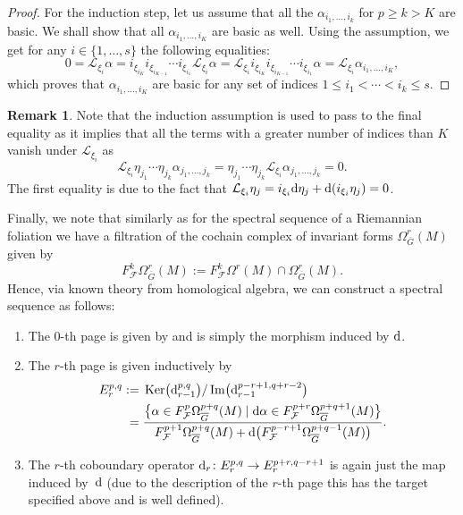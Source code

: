 \documentclass[pdftex]{sigma}
\numberwithin{equation}{section}
\theoremstyle{definition}
\newtheorem{rem}[tw]{Remark}
\begin{document}
\begin{proof}
For the induction step, let us assume that all the $\alpha_{i_1,\dots,i_{k}}$ for $p\geq k>K$ are basic. We shall show that all $\alpha_{i_1,\dots,i_{K}}$ are basic as well. Using the assumption, we get for any $i\in\{1,\dots,s\}$ the following equalities:
\[0=\mathcal{L}_{\xi_i}\alpha=i_{\xi_{i_K}}i_{\xi_{i_{K-1}}}\cdots i_{\xi_{i_1}}\mathcal{L}_{\xi_i}\alpha=\mathcal{L}_{\xi_i}i_{\xi_{i_K}}i_{\xi_{i_{K-1}}}\cdots i_{\xi_{i_1}}\alpha=\mathcal{L}_{\xi_i}\alpha_{i_1,\dots,i_K},\]
which proves that $\alpha_{i_1,\dots,i_K}$ are basic for any set of indices $1\leq i_1<\cdots <i_k\leq s$.
\end{proof}

\begin{rem} Note that the induction assumption is used to pass to the final equality as it implies that all the terms with a greater number of indices than $K$ vanish under $\mathcal{L}_{\xi_i}$ as
\[\mathcal{L}_{\xi_i}\eta_{j_1}\cdots \eta_{j_k}\alpha_{j_1,\dots,j_k}=\eta_{j_1}\cdots \eta_{j_k}\mathcal{L}_{\xi_i}\alpha_{j_1,\dots,j_k}=0.\]
The first equality is due to the fact that $\mathcal{L}_{\xi_i}\eta_j=i_{\xi_i}{\rm d}\eta_j+{\rm d}(i_{\xi_i}\eta_j)=0$.
\end{rem}
Finally, we note that similarly as for the spectral sequence of a Riemannian foliation we have a filtration of the cochain complex of invariant forms $\Omega^r_{\overline{G}}(M)$ given by
\[F^k_{\mathcal{F}}\Omega^r_{\overline{G}}(M):=F^k_{\mathcal{F}}\Omega^r(M)\cap\Omega^r_{\overline{G}}(M).\]
Hence, via known theory from homological algebra, we can construct a spectral sequence as follows:
\begin{enumerate}\itemsep=0pt
\item The $0$-th page is given by  and  is simply the morphism induced by ${\rm d}$.
\item The $r$-th page is given inductively by
\begin{align*}
E_{r}^{p,q}:={}&\operatorname{Ker}\bigl({\rm d}^{p,q}_{r-1}\bigr)\slash \operatorname{Im}\bigl({\rm d}^{p-r+1,q+r-2}_{r-1}\bigr)\\
={}&\frac{\bigl\{\alpha\in F^{p}_{\mathcal{F}}\Omega^{p+q}_{\overline{G}}(M)\mid {\rm d}\alpha\in F_{\mathcal{F}}^{p+r}\Omega^{p+q+1}_{\overline{G}}(M)\bigr\}}{F^{p+1}_{\mathcal{F}} \Omega^{p+q}_{\overline{G}}(M)+{\rm d}\bigl(F_{\mathcal{F}}^{p-r+1}\Omega_{\overline{G}}^{p+q-1}(M)\bigr)}.
\end{align*}
\item The $r$-th coboundary operator ${\rm d}_r\colon E_r^{p,q}\to E^{p+r,q-r+1}_r$ is again just the map induced by~${\rm d}$ (due to the description of the $r$-th page this has the target specified above and is well defined).
\end{enumerate}
\end{document}
